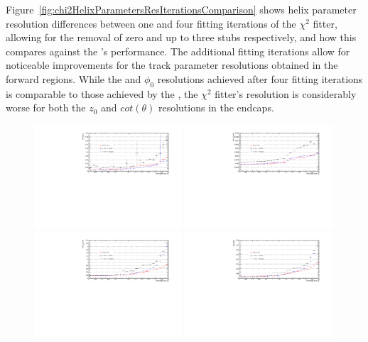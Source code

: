 Figure~\ref{fig:chi2HelixParametersResIterationsComparison} shows helix parameter resolution differences between one and four fitting iterations of the $\chi^{2}$ fitter, allowing for the removal of zero and up to three stubs respectively, and how this compares against the \KF's performance.
The additional fitting iterations allow for noticeable improvements for the track parameter resolutions obtained in the forward regions.
While the \qpt and $\phi_{0}$ resolutions achieved after four fitting iterations is comparable to those achieved by the \KF, the $\chi^{2}$ fitter's resolution is considerably worse for both the $z_{0}$ and $cot(\theta)$ resolutions in the endcaps.

\begin{figure}[htb]
\centering
\includegraphics[width=0.49\textwidth]{figs/tk-upgrade/results-chi2fitter/ptRelResVsEta_IterationComparison.pdf}
\includegraphics[width=0.49\textwidth]{figs/tk-upgrade/results-chi2fitter/phi0ResVsEta_IterationComparison.pdf}
\\
\includegraphics[width=0.49\textwidth]{figs/tk-upgrade/results-chi2fitter/z0ResVsEta_IterationComparison.pdf}
\includegraphics[width=0.49\textwidth]{figs/tk-upgrade/results-chi2fitter/cotThetaResVsEta_IterationComparison.pdf}

\end{figure}
